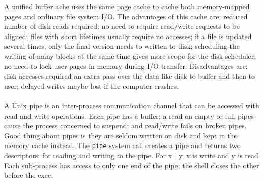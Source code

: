 \documentclass[twoside]{article}
\begin{document}
A unified buffer ache uses the same page cache to cache both memory-mapped pages and ordinary file system I/O. The advantages of this cache are: reduced number of disk reads required; no need to require read/write requests to be aligned; files with short lifetimes usually require no accesses; if a file is updated several times, only the final version needs to written to disk; scheduling the writing of many blocks at the same time gives more scope for the disk scheduler; no need to lock user pages in memory during I/O transfer. Disadvantages are: disk accesses required an extra pass over the data like disk to buffer and then to user; delayed writes maybe lost if the computer crashes.\\ \\
A Unix pipe is an inter-process communication channel that can be accessed with read and write operations. Each pipe has a buffer; a read on empty or full pipes cause the process concerned to suspend; and read/write fails on broken pipes. Good thing about pipes is they are seldom written on disk and kept in the memory cache instead. The \texttt{pipe} system call creates a pipe and returns two descriptors: for reading and writing to the pipe. For x | y, x is write and y is read. Each sub-process has access to only one end of the pipe; the shell closes the other before the exec.\\ \\ \\
\end{document}
